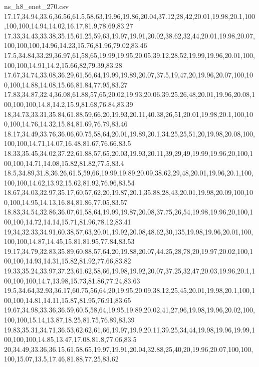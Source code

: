 \begin{filecontents*}[overwrite]{ns_h8_enet_270.csv}
17.17,34.94,33.6,36.56,61.5,58,63,19.96,19.86,20.04,37.12,28,42,20.01,19.98,20.1,100,100,100,14.94,14.02,16.17,81.9,78.69,83.27
17.33,34.43,33.38,35.15,61.25,59,63,19.97,19.91,20.02,38.62,32,44,20.01,19.98,20.07,100,100,100,14.96,14.23,15.76,81.96,79.02,83.46
17.5,34.84,33.29,36.97,61,58,65,19.99,19.95,20.05,39.12,28,52,19.99,19.96,20.01,100,100,100,14.91,14.2,15.66,82,79.39,83.28
17.67,34.74,33.08,36.29,61,56,64,19.99,19.89,20.07,37.5,19,47,20,19.96,20.07,100,100,100,14.88,14.08,15.66,81.84,77.95,83.27
17.83,34.87,32.4,36.08,61.88,57,65,20.02,19.93,20.06,39.25,26,48,20.01,19.96,20.08,100,100,100,14.8,14.2,15.9,81.68,76.84,83.39
18,34.73,33.31,35.84,61.88,59,66,20,19.93,20.11,40.38,26,51,20.01,19.98,20.1,100,100,100,14.76,14.32,15.84,81.69,76.79,83.46
18.17,34.49,33.76,36.06,60.75,58,64,20.01,19.89,20.1,34.25,25,51,20,19.98,20.08,100,100,100,14.71,14.07,16.48,81.67,76.66,83.5
18.33,35.45,34.02,37.22,61.88,57,65,20.03,19.93,20.11,39,29,49,19.99,19.96,20,100,100,100,14.71,14.08,15.82,81.82,77.5,83.4
18.5,34.89,31.8,36.26,61.5,59,66,19.99,19.89,20.09,38.62,29,48,20.01,19.96,20.1,100,100,100,14.62,13.92,15.62,81.92,76.96,83.54
18.67,34.03,32.97,35.17,60,57,62,20,19.87,20.1,35.88,28,43,20.01,19.98,20.09,100,100,100,14.95,14.13,16.84,81.86,77.05,83.57
18.83,34.54,32.86,36.07,61,58,64,19.99,19.87,20.08,37.75,26,54,19.98,19.96,20,100,100,100,14.72,14.14,15.71,81.96,78.12,83.41
19,34,32.33,34.91,60.38,57,63,20.01,19.92,20.08,48.62,30,135,19.98,19.96,20.01,100,100,100,14.87,14.45,15.81,81.95,77.84,83.53
19.17,34.79,32.83,35.89,60.88,57,64,20,19.88,20.07,44.25,28,78,20,19.97,20.02,100,100,100,14.93,14.31,15.82,81.92,77.66,83.82
19.33,35.24,33.97,37.23,61.62,58,66,19.98,19.92,20.07,37.25,32,47,20.03,19.96,20.1,100,100,100,14.7,13.98,15.73,81.86,77.24,83.63
19.5,34.64,32.93,36.17,60.75,56,64,20,19.95,20.09,38.12,25,45,20.01,19.98,20.1,100,100,100,14.81,14.11,15.87,81.95,76.91,83.65
19.67,34.98,33.36,36.59,60.5,58,64,19.95,19.89,20.02,41,27,96,19.98,19.96,20.02,100,100,100,15.14,13.87,18.25,81.75,76.89,83.39
19.83,35.31,34.71,36.53,62.62,61,66,19.97,19.9,20.11,39.25,34,44,19.98,19.96,19.99,100,100,100,14.85,13.47,17.08,81.8,77.06,83.5
20,34.49,33.36,36.15,61,58,65,19.97,19.91,20.04,32.88,25,40,20,19.96,20.07,100,100,100,15.07,13.5,17.46,81.88,77.25,83.62
\end{filecontents*}

